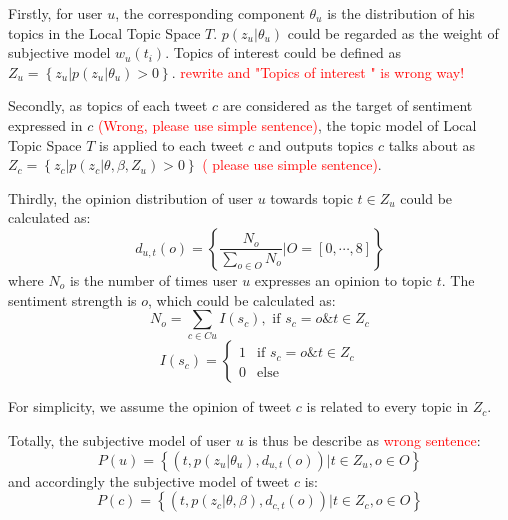 \documentclass{acm_proc_article-sp}
\newcommand{\mo}[1]{\textcolor{red}{#1}}
\begin{document}
\begin{itemize*}
\item Firstly, for user $ u $, the corresponding component $ \theta_{u} $ is the distribution of his topics in the Local Topic Space $ T $. $ p\left( z_{u} \vert \theta_{u} \right)  $ could be regarded as the weight of subjective model $ w_{u} \left( t_{i} \right)  $. Topics of interest could be defined as $ Z_{u}= \left\lbrace z_{u} \vert p\left( z_{u} \vert \theta_{u} \right)>0 \right\rbrace $. \mo{rewrite and "Topics of interest " is wrong way!}
\item Secondly, as topics of each tweet $ c $ are considered as the target of sentiment expressed in $ c $ \mo{(Wrong, please use simple sentence)}, the topic model of Local Topic Space $ T $ is applied to each tweet $ c $ and outputs topics $ c $ talks about as $ Z_{c} =\left\lbrace z_{c} \vert p\left( z_{c} \vert \theta, \beta, Z_{u} \right)>0 \right\rbrace $ \mo{( please use simple sentence)}.
\item Thirdly, the opinion distribution of user $ u $ towards topic $ t \in Z_{u} $ could be calculated as:
\begin{equation}
\label{opinionall}
d_{u,t}\left( o \right) = \left\lbrace \dfrac{N_{o}}{\sum_{o \in O} N_{o}} \vert O=\left[ 0, \cdots, 8 \right] \right\rbrace 
\end{equation}
where $ N_{o} $ is the number of times user $ u $ expresses an opinion to topic $ t $. The sentiment strength is $ o $, which could be calculated as:
\begin{equation}
\label{opinion1}
N_{o}=\sum_{c \in Cu} I\left( s_{c} \right) , \text{ if } s_{c}=o \& t \in Z_{c}
\end{equation}
\begin{equation}
\label{opinion2}
I\left( s_{c} \right)=\left\{
\begin{array}{ll}
{1} & \text{if } s_{c}=o \& t \in Z_{c}\\
{0} & \text{else}
\end{array}
\right.
\end{equation}

For simplicity, we assume the opinion of tweet $ c $ is related to every topic in $ Z_{c} $.

\end{itemize*}

Totally, the subjective model of user $ u $ is thus be describe as \mo{wrong sentence}:
\begin{equation}
\label{subuser}
P\left( u \right)= \left\lbrace \left( t, p\left( z_{u} \vert \theta_{u} \right), d_{u,t}\left( o \right) \right)  \vert t \in Z_{u}, o \in O  \right\rbrace  
\end{equation}
and accordingly the subjective model of tweet $ c $ is:
\begin{equation}
\label{subtweet}
P\left( c \right)= \left\lbrace \left( t, p\left( z_{c} \vert \theta, \beta \right), d_{c,t}\left( o \right) \right)  \vert t \in Z_{c}, o \in O  \right\rbrace  
\end{equation}
\end{document}
